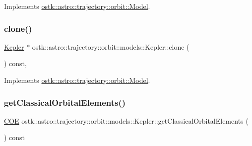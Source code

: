 Implements \hyperlink{classostk_1_1astro_1_1trajectory_1_1orbit_1_1_model_a34a0d8979ec1f7ade3e434fc0dad3711}{ostk\+::astro\+::trajectory\+::orbit\+::\+Model}.

\mbox{\label{classostk_1_1astro_1_1trajectory_1_1orbit_1_1models_1_1_kepler_afb76b3571c73fb5c87129033f7d66520}} 
\subsubsection{\texorpdfstring{clone()}{clone()}}
{\footnotesize\ttfamily \hyperlink{classostk_1_1astro_1_1trajectory_1_1orbit_1_1models_1_1_kepler}{Kepler} $\ast$ ostk\+::astro\+::trajectory\+::orbit\+::models\+::\+Kepler\+::clone (\begin{DoxyParamCaption}{ }\end{DoxyParamCaption}) const\hspace{0.3cm}{\ttfamily [override]}, {\ttfamily [virtual]}}



Implements \hyperlink{classostk_1_1astro_1_1trajectory_1_1orbit_1_1_model_a53dc07564e4c7c444da46360aa8ada15}{ostk\+::astro\+::trajectory\+::orbit\+::\+Model}.

\mbox{\label{classostk_1_1astro_1_1trajectory_1_1orbit_1_1models_1_1_kepler_a1a5e2d4a27c4e20d91924a3a751cbba4}} 
\subsubsection{\texorpdfstring{get\+Classical\+Orbital\+Elements()}{getClassicalOrbitalElements()}}
{\footnotesize\ttfamily \hyperlink{classostk_1_1astro_1_1trajectory_1_1orbit_1_1models_1_1kepler_1_1_c_o_e}{C\+OE} ostk\+::astro\+::trajectory\+::orbit\+::models\+::\+Kepler\+::get\+Classical\+Orbital\+Elements (\begin{DoxyParamCaption}{ }\end{DoxyParamCaption}) const}

